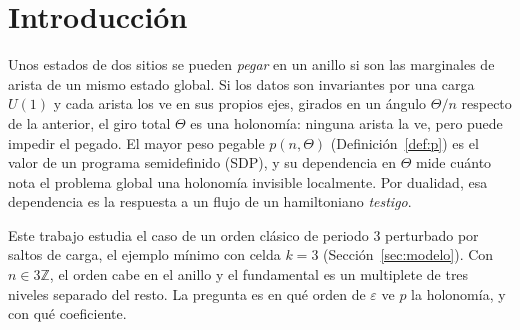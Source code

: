 \documentclass[11pt,a4paper]{article}
\theoremstyle{definition}
\theoremstyle{remark}
\newcommand{\eps}{\varepsilon}
\begin{document}
\section{Introducción}

Unos estados de dos sitios se pueden \emph{pegar} en un anillo si son las marginales de arista de un
mismo estado global. Si los datos son invariantes por una carga $U(1)$ y cada arista los ve en sus
propios ejes, girados en un ángulo $\Theta/n$ respecto de la anterior, el giro total $\Theta$ es una
holonomía: ninguna arista la ve, pero puede impedir el pegado. El mayor peso pegable $p(n,\Theta)$
(Definición~\ref{def:p}) es el valor de un programa semidefinido (SDP), y su dependencia en $\Theta$
mide cuánto nota el problema global una holonomía invisible localmente. Por dualidad, esa dependencia
es la respuesta a un flujo de un hamiltoniano \emph{testigo}.

Este trabajo estudia el caso de un orden clásico de periodo $3$ perturbado por saltos de carga, el
ejemplo mínimo con celda $k=3$ (Sección~\ref{sec:modelo}). Con $n\in3\mathbb Z$, el orden cabe en el
anillo y el fundamental es un multiplete de tres niveles separado del resto. La pregunta es en qué
orden de $\eps$ ve $p$ la holonomía, y con qué coeficiente.
\end{document}
